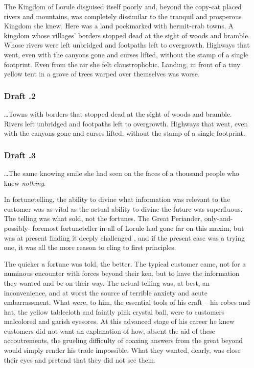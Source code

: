 \documentclass[../FGP.tex]{subfiles}
\begin{document}
\begin{fragment}
The Kingdom of Lorule disguised itself poorly and, beyond the copy-cat placed rivers and mountains, was completely dissimilar to the tranquil and prosperous Kingdom she knew. Here was a land pockmarked with hermit-crab towns. A kingdom whose villages' borders stopped dead at the sight of woods and bramble. Whose rivers were left unbridged and footpaths left to overgrowth. Highways that went, even with the canyons gone and curses lifted, without the stamp of a single footprint. Even from the air she felt claustrophobic. Landing, in front of a tiny yellow tent in a grove of trees warped over themselves was worse.

\subsubsection{Draft \thefragment.2}\ldots Towns with borders that stopped dead at the sight of woods and bramble. Rivers left unbridged and footpaths left to overgrowth. Highways that went, even with the canyons gone and curses lifted, without the stamp of a single footprint. 

\subsubsection{Draft \thefragment.3}
\ldots The same knowing smile she had seen on the faces of a thousand people who knew \emph{nothing}. 
\end{fragment}

\begin{fragment}In fortunetelling, the ability to divine what information was relevant to the customer was as vital as the actual ability to divine the future was superfluous. The telling was what sold, not the fortunes. The Great Periander, only-and-possibly- foremost fortuneteller in all of Lorule had gone far on this maxim, but was at present finding it deeply challenged , and if the present case was a trying one, it was all the more reason to cling to first principles.\end{fragment}
                    
\begin{fragment}The quicker a fortune was told, the better. The typical customer came, not for a numinous encounter with forces beyond their ken, but to have the information they wanted and be on their way.  The actual telling was, at best, an inconvenience, and at worst the source of terrible anxiety and acute embarrassment. What were, to him, the essential tools of his craft -- his robes and hat, the yellow tablecloth and faintly pink crystal ball, were to customers malcolored and garish eyesores. At this advanced stage of his career he knew customers did not want an explanation of how, absent the aid of these accoutrements, the grueling difficulty of coaxing answers from the great beyond would simply render his trade impossible. What they wanted, dearly, was close their eyes and pretend that they did not see them.\end{fragment} 
\end{document}
